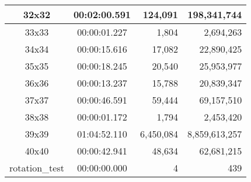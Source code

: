 \begin{center}
\begin{tabular}{|c|c|r|r|}
		32x32 & 00:02:00.591 & 124,091 & 198,341,744 \\ \hline
		33x33 & 00:00:01.227 & 1,804 & 2,694,263 \\ \hline
		34x34 & 00:00:15.616 & 17,082 & 22,890,425 \\ \hline
		35x35 & 00:00:18.245 & 20,540 & 25,953,977 \\ \hline
		36x36 & 00:00:13.237 & 15,788 & 20,839,347 \\ \hline
		37x37 & 00:00:46.591 & 59,444 & 69,157,510 \\ \hline
		38x38 & 00:00:01.172 & 1,794 & 2,453,420 \\ \hline
		39x39 & 01:04:52.110 & 6,450,084 & 8,859,613,257 \\ \hline
		40x40 & 00:00:42.941 & 48,634 & 62,681,215 \\ \hline
		rotation\_test & 00:00:00.000 & 4 & 439 \\ \hline

    \end{tabular}
\end{center}
